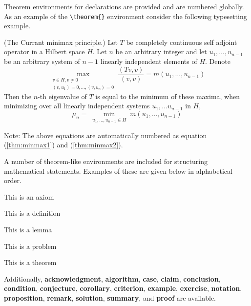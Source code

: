 Theorem environments for declarations are provided and are numbered globally.
As an example of the \verb|\theorem{}| environment consider the following typesetting example.
\begin{theorem}
 (The Currant minimax principle.) Let $T$ be completely continuous self adjoint operator
 in a Hilbert space $H$. Let $n$ be an arbitrary integer and let $u_1,\ldots,u_{n-1}$ be
 an arbitrary system of $n-1$ linearly independent elements of $H$. Denote
 \begin{equation}
  \max_{\substack{v\in H, v\neq
   0\\(v,u_1)=0,\ldots,(v,u_n)=0}}\frac{(Tv,v)}{(v,v)}=m(u_1,\ldots, u_{n-1})
  \label{thm:minmax1}
 \end{equation}
 Then the $n$-th eigenvalue of $T$ is equal to the minimum of these maxima, when
 minimizing over all linearly independent systems $u_1,\ldots u_{n-1}$ in $H$,
 \begin{equation}
  \mu_n = \min_{\substack{u_1,\ldots, u_{n-1}\in H}} m(u_1,\ldots, u_{n-1}) \label{thm:minmax2}
 \end{equation}
\end{theorem}
Note: The above equations are automatically numbered as equation (\ref{thm:minmax1}) and
(\ref{thm:minmax2}).



A number of theorem-like environments are included for structuring mathematical statements.  Examples of these are given below in alphabetical order.

\begin{axiom}
 This is an axiom
\end{axiom}


\begin{definition}
 This is a definition
\end{definition}


\begin{lemma}
 This is a lemma
\end{lemma}

\begin{problem}
This is a problem
\end{problem}



\begin{theorem}
 This is a theorem
\end{theorem}

Additionally, {\bf acknowledgment}, {\bf algorithm}, {\bf case}, {\bf claim}, {\bf conclusion}, {\bf condition},
{\bf conjecture}, {\bf corollary}, {\bf criterion}, {\bf example}, {\bf exercise}, {\bf notation},
{\bf proposition}, {\bf remark}, {\bf solution}, {\bf summary}, and {\bf proof} are available.

